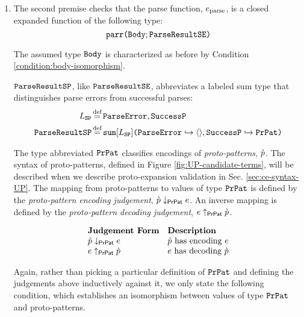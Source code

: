 {{{{\begin{enumerate}
\item The second premise checks that the parse function, $e_\text{parse}$, is a closed expanded function of the following type: \[\texttt{parr}\texttt{(}\mathtt{Body}; \mathtt{ParseResultSE}\texttt{)}\] %

The assumed type $\mathtt{Body}$ is characterized as before by Condition \ref{condition:body-isomorphism}.

$\mathtt{ParseResultSP}$, like $\mathtt{ParseResultSE}$, abbreviates a labeled sum type that distinguishes parse errors from successful parses:
\begin{align*}
L_\mathtt{SP} & \defeq \lbltxt{ParseError}, \lbltxt{SuccessP}\\
\tParseResultPat & \defeq \asum{L_\mathtt{SP}}{
  \mapitem{\lbltxt{ParseError}}{\prodt{}}, 
  \mapitem{\lbltxt{SuccessP}}{\tCEPat}
}
\end{align*} %

The type abbreviated $\mathtt{PrPat}$ classifies encodings of \emph{proto-patterns}, $\grave{p}$. The syntax of proto-patterns, defined in Figure \ref{fig:UP-candidate-terms}, will be described when we describe proto-expansion validation in Sec. \ref{sec:ce-syntax-UP}. The mapping from proto-patterns to values of type $\mathtt{PrPat}$ is defined by the \emph{proto-pattern encoding judgement}, $\grave{p} \downarrow_\mathsf{PrPat} e$. An inverse mapping is defined by the \emph{proto-pattern decoding judgement}, $e \uparrow_\mathsf{PrPat} \grave{p}$.

\[\begin{array}{ll}
\textbf{Judgement Form} & \textbf{Description}\\
\grave{p} \downarrow_\mathsf{PrPat} e & \text{$\grave{p}$ has encoding $e$}\\
e \uparrow_\mathsf{PrPat} \grave{p} & \text{$e$ has decoding $\grave{p}$}
\end{array}\]

Again, rather than picking a particular definition of $\mathtt{PrPat}$ and defining the judgements above inductively against it, we only state the following condition, which establishes an isomorphism between values of type $\mathtt{PrPat}$ and proto-patterns.


\end{enumerate}}}}}
